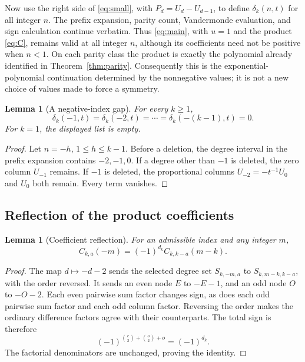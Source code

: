 \documentclass[11pt,letterpaper]{article}
\numberwithin{equation}{section}
\newtheorem{lemma}[theorem]{Lemma}
\theoremstyle{definition}
\begin{document}
Now use the right side of \eqref{eq:small}, with
\(P_d=U_d-U_{d-1}\), to define \(\delta_k(n,t)\) for all integer
\(n\). The prefix expansion, parity count, Vandermonde evaluation,
and sign calculation continue verbatim. Thus \eqref{eq:main}, with
\(u=1\) and the product \eqref{eq:C}, remains valid at all integer
\(n\), although its coefficients need not be positive when \(n<1\).
On each parity class the product is exactly the polynomial already
identified in Theorem~\ref{thm:parity}. Consequently this is the
exponential-polynomial continuation determined by the nonnegative values;
it is not a new choice of values made to force a symmetry.

\begin{lemma}[A negative-index gap]\label{lem:gap}
For every \(k\ge1\),
\begin{equation}\label{eq:gap}
 \delta_k(-1,t)=\delta_k(-2,t)=\cdots
 =\delta_k(-(k-1),t)=0.
\end{equation}
For \(k=1\), the displayed list is empty.
\end{lemma}
\begin{proof}
Let \(n=-h\), \(1\le h\le k-1\). Before a deletion, the degree
interval in the prefix expansion contains \(-2,-1,0\). If a degree
other than \(-1\) is deleted, the zero column \(U_{-1}\) remains.
If \(-1\) is deleted, the proportional columns
\(U_{-2}=-t^{-1}U_0\) and \(U_0\) both remain. Every term vanishes.
\end{proof}

\subsection{Reflection of the product coefficients}
\begin{lemma}[Coefficient reflection]\label{lem:Creflection}
For an admissible index and any integer \(m\),
\begin{equation}\label{eq:Creflection}
 C_{k,a}(-m)=(-1)^{d_k}C_{k,k-a}(m-k).
\end{equation}
\end{lemma}
\begin{proof}
The map \(d\mapsto-d-2\) sends the selected degree set
\(S_{k,-m,a}\) to \(S_{k,m-k,k-a}\), with the order reversed.
It sends an even node \(E\) to \(-E-1\), and an odd node \(O\)
to \(-O-2\). Each even pairwise sum factor changes sign, as does
each odd pairwise sum factor and each odd column factor.
Reversing the order makes the ordinary difference factors agree with
their counterparts. The total sign is therefore
\[
 (-1)^{\binom e2+\binom o2+o}=(-1)^{d_k}.
\]
The factorial denominators are unchanged, proving the identity.
\end{proof}
\end{document}

